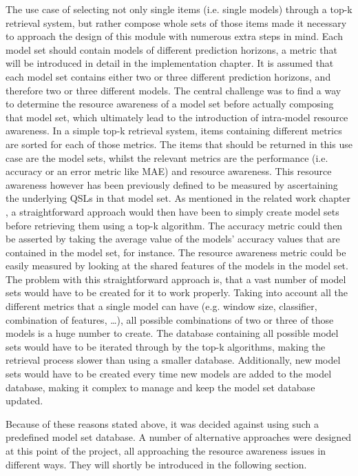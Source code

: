 The use case of selecting not only single items (i.e. single models) through a top-k retrieval system, but rather compose whole sets of those items made it necessary to approach the design of this module with numerous extra steps in mind. Each model set should contain models of different prediction horizons, a metric that will be introduced in detail in the implementation chapter. It is assumed that each model set contains either two or three different prediction horizons, and therefore two or three different models. The central challenge was to find a way to determine the resource awareness of a model set before actually composing that model set, which ultimately lead to the introduction of intra-model resource awareness. In a simple top-k retrieval system, items containing different metrics are sorted for each of those metrics. The items that should be returned in this use case are the model sets, whilst the relevant metrics are the performance (i.e. accuracy or an error metric like MAE) and resource awareness. This resource awareness however has been previously defined to be measured by ascertaining the underlying QSLs in that model set. As mentioned in the related work chapter %
, a straightforward approach would then have been to simply create model sets before retrieving them using a top-k algorithm. The accuracy metric could then be asserted by taking the average value of the models’ accuracy values that are contained in the model set, for instance. The resource awareness metric could be easily measured by looking at the shared features of the models in the model set. The problem with this straightforward approach is, that a vast number of model sets would have to be created for it to work properly. Taking into account all the different metrics that a single model can have (e.g. window size, classifier, combination of features, …), all possible combinations of two or three of those models is a huge number to create. The database containing all possible model sets would have to be iterated through by the top-k algorithms, making the retrieval process slower than using a smaller database. Additionally, new model sets would have to be created every time new models are added to the model database, making it complex to manage and keep the model set database updated. 

Because of these reasons stated above, it was decided against using such a predefined model set database. A number of alternative approaches were designed at this point of the project, all approaching the resource awareness issues in different ways. They will shortly be introduced in the following section. 

